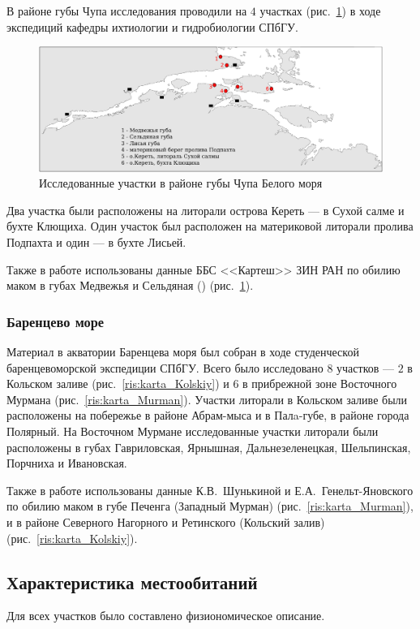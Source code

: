 В районе губы Чупа исследования проводили на $4$ участках (рис.~\ref{ris:karta_Chupa}) в ходе экспедиций кафедры ихтиологии и гидробиологии СПбГУ. 
\begin{figure}
    \includegraphics[width=\textwidth]{../maps/map_Chupa.pdf}
    \caption{Исследованные участки в районе губы Чупа Белого моря}
    \label{ris:karta_Chupa}
\end{figure}
Два участка были расположены на литорали острова Кереть --- в Сухой салме и бухте Клющиха. 
Один участок был расположен на материковой литорали пролива Подпахта и один --- в бухте Лисьей.

Также в работе использованы данные ББС <<Картеш>> ЗИН РАН по обилию маком в губах Медвежья и Сельдяная (\cite{Varfolomeeva_Naumov_2013}) (рис.~\ref{ris:karta_Chupa}).

		\subsubsection{Баренцево море}
Материал  в акватории Баренцева моря  был  собран    в ходе   студенческой баренцевоморской экспедиции СПбГУ. 
Всего было исследовано $8$ участков --- $2$ в Кольском заливе (рис.~\ref{ris:karta_Kolskiy})   и   $6$  в   прибрежной   зоне  Восточного  Мурмана (рис.~\ref{ris:karta_Murman}).  
Участки литорали  в   Кольском   заливе   были  расположены на побережье в районе Абрам-мыса и в Палa-губе, в районе города Полярный. 
На   Восточном   Мурмане исследованные участки литорали  были   расположены   в   губах   Гавриловская,  Ярнышная, Дальнезеленецкая, Шельпинская, Порчниха и Ивановская.

Также в работе использованы данные К.\:В.~Шунькиной и Е.\:А.~Генельт-Яновского по обилию маком в губе Печенга (Западный Мурман) (рис.~\ref{ris:karta_Murman}), и в районе Северного Нагорного и Ретинского (Кольский залив) (рис.~\ref{ris:karta_Kolskiy}).

    \subsection{Характеристика местообитаний}
Для всех участков было составлено физиономическое описание.

